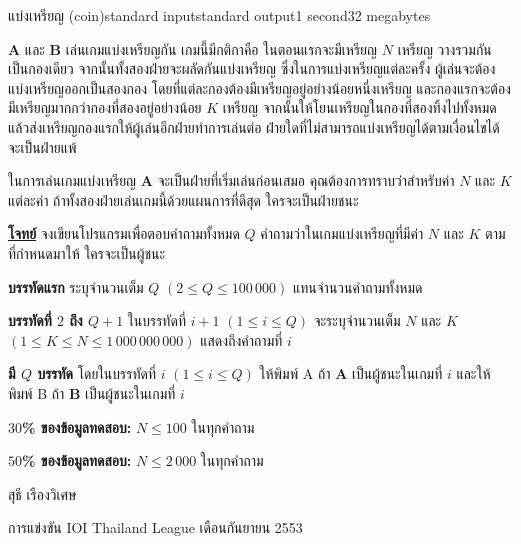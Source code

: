 \documentclass[11pt,a4paper]{article}
\begin{document}
\begin{problem}{แบ่งเหรียญ (coin)}{standard input}{standard output}{1 second}{32 megabytes}

\textbf{A} และ \textbf{B} เล่นเกมแบ่งเหรียญกัน เกมนี้มีกติกาคือ ในตอนแรกจะมีเหรียญ $N$ เหรียญ วางรวมกันเป็นกองเดียว จากนั้นทั้งสองฝ่ายจะผลัดกันแบ่งเหรียญ ซึ่งในการแบ่งเหรียญแต่ละครั้ง ผู้เล่นจะต้องแบ่งเหรียญออกเป็นสองกอง โดยที่แต่ละกองต้องมีเหรียญอยู่อย่างน้อยหนึ่งเหรียญ และกองแรกจะต้องมีเหรียญมากกว่ากองที่สองอยู่อย่างน้อย $K$ เหรียญ จากนั้นให้โยนเหรียญในกองที่สองทิ้งไปทั้งหมด แล้วส่งเหรียญกองแรกให้ผู้เล่นอีกฝ่ายทำการเล่นต่อ ฝ่ายใดที่ไม่สามารถแบ่งเหรียญได้ตามเงื่อนไขได้จะเป็นฝ่ายแพ้

ในการเล่นเกมแบ่งเหรียญ \textbf{A} จะเป็นฝ่ายที่เริ่มเล่นก่อนเสมอ คุณต้องการทราบว่าสำหรับค่า $N$ และ $K$ แต่ละค่า ถ้าทั้งสองฝ่ายเล่นเกมนี้ด้วยแผนการที่ดีสุด ใครจะเป็นฝ่ายชนะ

\bigskip
\underline{\textbf{โจทย์}}  จงเขียนโปรแกรมเพื่อตอบคำถามทั้งหมด $Q$ คำถามว่าในเกมแบ่งเหรียญที่มีค่า $N$ และ $K$ ตามที่กำหนดมาให้ ใครจะเป็นผู้ชนะ


\InputFile

\textbf{บรรทัดแรก} ระบุจำนวนเต็ม $Q$ $(2 \leq Q \leq 100\,000)$ แทนจำนวนคำถามทั้งหมด

\textbf{บรรทัดที่ $2$ ถึง $Q+1$} ในบรรทัดที่ $i+1$ $(1 \leq i \leq Q)$ จะระบุจำนวนเต็ม $N$ และ $K$ $(1 \leq K \leq N \leq 1\,000\,000\,000)$ แสดงถึงคำถามที่ $i$


\OutputFile

\textbf{มี $Q$ บรรทัด} โดยในบรรทัดที่ $i$ $(1 \leq i \leq Q)$ ให้พิมพ์ A ถ้า \textbf{A} เป็นผู้ชนะในเกมที่ $i$ และให้พิมพ์ B ถ้า \textbf{B} เป็นผู้ชนะในเกมที่ $i$

\Examples

\begin{example}
%
%
\end{example}

\Scoring

\textbf{$30$\% ของข้อมูลทดสอบ:} $N \leq 100$ ในทุกคำถาม

\textbf{$50$\% ของข้อมูลทดสอบ:} $N \leq 2\,000$ ในทุกคำถาม

\Source

สุธี เรืองวิเศษ

การแข่งขัน IOI Thailand League เดือนกันยายน 2553

\end{problem}
\end{document}
